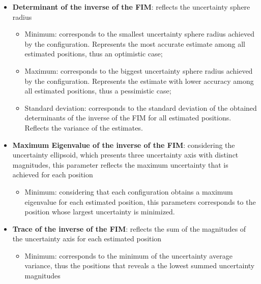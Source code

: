 \begin{itemize}
	\item \textbf{Determinant of the inverse of the FIM}: reflects the uncertainty sphere radius
	\begin{itemize}
			\item Minimum: corresponds to the smallest  uncertainty sphere radius achieved by the configuration. Represents the most accurate estimate among all estimated positions, thus an optimistic case;
			\item Maximum: corresponds to the biggest uncertainty sphere radius achieved by the configuration. Represents the estimate with lower accuracy among all estimated positions, thus a pessimistic case;
			\item Standard deviation: corresponds to the standard deviation of the obtained determinants of the inverse of the FIM for all estimated positions. Reflects the variance of the estimates.
	\end{itemize}
	\item \textbf{ Maximum Eigenvalue of the inverse of the FIM}: considering the uncertainty ellipsoid, which presents three uncertainty axis with distinct magnitudes, this parameter reflects the maximum uncertainty that is achieved for each position
	\begin{itemize}
			\item Minimum: considering that each configuration obtains a maximum eigenvalue for each estimated position, this parameters corresponds to the position whose largest uncertainty is minimized.
	\end{itemize}
	\item \textbf{Trace of the inverse of the FIM}: reflects the sum of the magnitudes of the uncertainty axis for each estimated position
	\begin{itemize}
			\item Minimum: corresponds to the minimum of the uncertainty average variance, thus the positions that reveals a the lowest summed uncertainty magnitudes
	\end{itemize}
\end{itemize}


